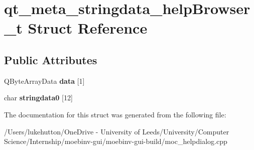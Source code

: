 \hypertarget{structqt__meta__stringdata__help_browser__t}{}\section{qt\+\_\+meta\+\_\+stringdata\+\_\+help\+Browser\+\_\+t Struct Reference}
\label{structqt__meta__stringdata__help_browser__t}
\subsection*{Public Attributes}
\begin{DoxyCompactItemize}
\item 
\mbox{\label{structqt__meta__stringdata__help_browser__t_a3cd7902717b8d64da130c710bb6178a0}} 
Q\+Byte\+Array\+Data {\bfseries data} \mbox{[}1\mbox{]}
\item 
\mbox{\label{structqt__meta__stringdata__help_browser__t_a79c6e92bd6dcec160a129977b9e80f9f}} 
char {\bfseries stringdata0} \mbox{[}12\mbox{]}
\end{DoxyCompactItemize}


The documentation for this struct was generated from the following file\+:\begin{DoxyCompactItemize}
\item 
/\+Users/lukehutton/\+One\+Drive -\/ University of Leeds/\+University/\+Computer Science/\+Internship/moebinv-\/gui/moebinv-\/gui-\/build/moc\+\_\+helpdialog.\+cpp\end{DoxyCompactItemize}
